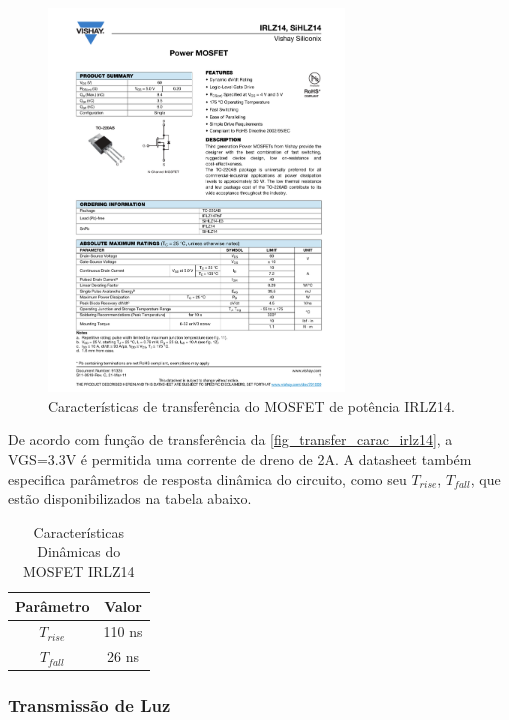 		\begin{figure}[htb]
			\caption{\label{fig_transfer_carac_irlz14} Características de transferência do MOSFET de potência IRLZ14.}
			\centering		%
			\includegraphics[page=3, width=0.7\textwidth, trim={12cm 16.5cm 2.2cm 5cm}, clip]{circuits/irlz14.pdf}
		\end{figure}
	
		De acordo com função de transferência da \autoref{fig_transfer_carac_irlz14}, a VGS=3.3V é permitida uma corrente de dreno de 2A. A datasheet também especifica parâmetros de resposta dinâmica do circuito, como seu $T_{rise}$, $T_{fall}$, que estão disponibilizados na tabela abaixo.
		
		\begin{table}[ht]
			\caption{Características Dinâmicas do MOSFET IRLZ14}
			\centering
			\begin{tabular}{c c}
				\hline
				Parâmetro  & Valor  \\ \hline
				$T_{rise}$ & 110 ns \\
				$T_{fall}$ & 26 ns  \\ \hline
			\end{tabular}
			\label{tab_irlz14_timing}
		\end{table}

	\subsubsection{Transmissão de Luz}
		
